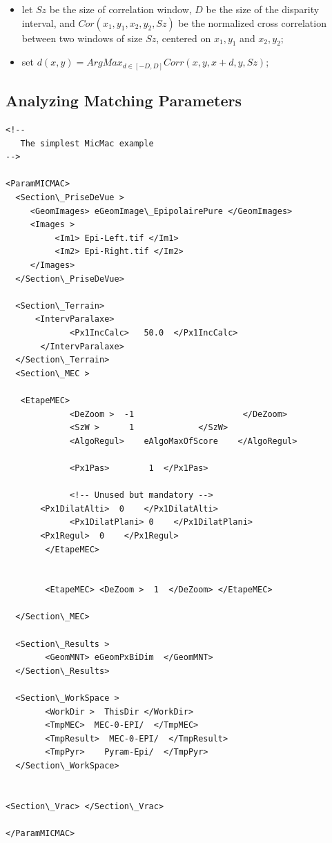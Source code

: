 \begin{itemize}
    \item let $Sz$ be the size of correlation window, $D$ be the size of the
          disparity interval, and $Cor(x_1,y_1,x_2,y_2,Sz)$ be the normalized
          cross correlation between two windows of size $Sz$, centered on $x_1,y_1$
           and $x_2,y_2$;

    \item set $d(x,y) = ArgMax_{d\in[-D,D]} Corr(x,y,x+d,y,Sz)$;
\end{itemize}


\subsection{Analyzing Matching Parameters}

{\scriptsize
\setlength{\columnseprule}{0.5pt}
\begin{multicols}{2}
\begin{verbatim}
<!--
   The simplest MicMac example
-->

<ParamMICMAC>
  <Section\_PriseDeVue >
     <GeomImages> eGeomImage\_EpipolairePure </GeomImages>
     <Images >
          <Im1> Epi-Left.tif </Im1>
          <Im2> Epi-Right.tif </Im2>
     </Images>
  </Section\_PriseDeVue>

  <Section\_Terrain>
      <IntervParalaxe>
             <Px1IncCalc>   50.0  </Px1IncCalc>
       </IntervParalaxe>
  </Section\_Terrain>
  <Section\_MEC >

   <EtapeMEC>
             <DeZoom >  -1                      </DeZoom>
             <SzW >      1             </SzW>
             <AlgoRegul>    eAlgoMaxOfScore    </AlgoRegul>

             <Px1Pas>        1  </Px1Pas>

             <!-- Unused but mandatory -->
       <Px1DilatAlti>  0    </Px1DilatAlti>
             <Px1DilatPlani> 0    </Px1DilatPlani>
       <Px1Regul>  0    </Px1Regul>
        </EtapeMEC>


        <EtapeMEC> <DeZoom >  1  </DeZoom> </EtapeMEC>

  </Section\_MEC>

  <Section\_Results >
        <GeomMNT> eGeomPxBiDim  </GeomMNT>
  </Section\_Results>

  <Section\_WorkSpace >
        <WorkDir >  ThisDir </WorkDir>
        <TmpMEC>  MEC-0-EPI/  </TmpMEC>
        <TmpResult>  MEC-0-EPI/  </TmpResult>
        <TmpPyr>    Pyram-Epi/  </TmpPyr>
  </Section\_WorkSpace>


<Section\_Vrac> </Section\_Vrac>

</ParamMICMAC>
\end{verbatim}
\end{multicols}
}

